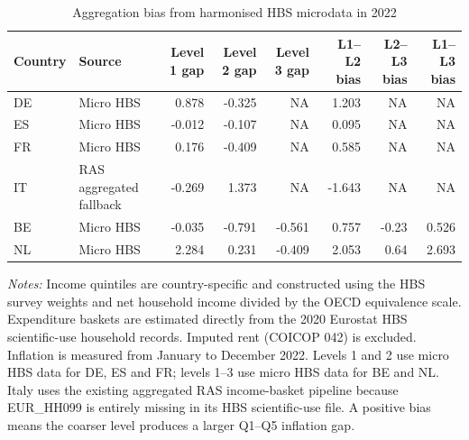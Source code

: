 \begin{table}

\caption{\label{tab:micro-hbs-aggregation-bias-2022}Aggregation bias from harmonised HBS microdata in 2022}
\centering
\begin{tabular}[t]{llrrrrrr}
\toprule
Country & Source & Level 1 gap & Level 2 gap & Level 3 gap & L1--L2 bias & L2--L3 bias & L1--L3 bias\\
\midrule
DE & Micro HBS & 0.878 & -0.325 & NA & 1.203 & NA & NA\\
ES & Micro HBS & -0.012 & -0.107 & NA & 0.095 & NA & NA\\
FR & Micro HBS & 0.176 & -0.409 & NA & 0.585 & NA & NA\\
IT & RAS aggregated fallback & -0.269 & 1.373 & NA & -1.643 & NA & NA\\
BE & Micro HBS & -0.035 & -0.791 & -0.561 & 0.757 & -0.23 & 0.526\\
\addlinespace
NL & Micro HBS & 2.284 & 0.231 & -0.409 & 2.053 & 0.64 & 2.693\\
\bottomrule
\end{tabular}
\end{table}
\begin{flushleft}
\footnotesize{\emph{Notes:} Income quintiles are country-specific and constructed using the HBS survey weights and net household income divided by the OECD equivalence scale. Expenditure baskets are estimated directly from the 2020 Eurostat HBS scientific-use household records. Imputed rent (COICOP 042) is excluded. Inflation is measured from January to December 2022. Levels 1 and 2 use micro HBS data for DE, ES and FR; levels 1--3 use micro HBS data for BE and NL. Italy uses the existing aggregated RAS income-basket pipeline because EUR_HH099 is entirely missing in its HBS scientific-use file. A positive bias means the coarser level produces a larger Q1--Q5 inflation gap.}
\end{flushleft}
